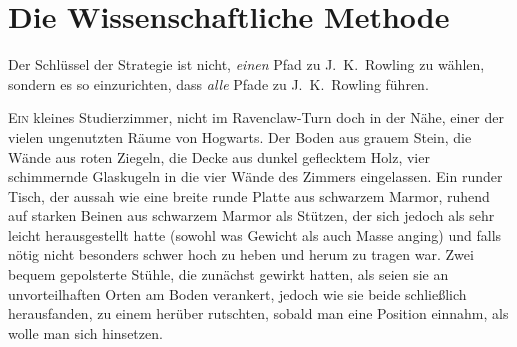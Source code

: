 \chapter{Die Wissenschaftliche Methode}

\begin{chapterOpeningAuthorNote}
Der Schlüssel der Strategie ist nicht, \emph{einen} Pfad zu J.~K.~Rowling zu wählen, sondern es so einzurichten, dass \emph{alle} Pfade zu J.~K.~Rowling führen.
\end{chapterOpeningAuthorNote}

\lettrine{E}{in} kleines Studierzimmer, nicht im Ravenclaw-Turn doch in der Nähe, einer der vielen ungenutzten Räume von Hogwarts. Der Boden aus grauem Stein, die Wände aus roten Ziegeln, die Decke aus dunkel geflecktem Holz, vier schimmernde Glaskugeln in die vier Wände des Zimmers eingelassen. Ein runder Tisch, der aussah wie eine breite runde Platte aus schwarzem Marmor, ruhend auf starken Beinen aus schwarzem Marmor als Stützen, der sich jedoch als sehr leicht herausgestellt hatte (sowohl was Gewicht als auch Masse anging) und falls nötig nicht besonders schwer hoch zu heben und herum zu tragen war. Zwei bequem gepolsterte Stühle, die zunächst gewirkt hatten, als seien sie an unvorteilhaften Orten am Boden verankert, jedoch wie sie beide schließlich herausfanden, zu einem herüber rutschten, sobald man eine Position einnahm, als wolle man sich hinsetzen.

